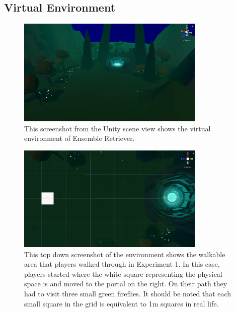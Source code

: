 \subsection{Virtual Environment}
\begin{figure}[tbph]
    \centering
    \includegraphics[width=0.8\textwidth]{figures/screenshots/EnvironmentKindaLowRes.png}
    \caption[Screenshot of the Environment in Ensemble Retriever]{This screenshot from the Unity scene view shows the virtual environment of Ensemble Retriever.}
    \label{fig:ensembleRetrieverEnvironment}
\end{figure}

\begin{figure}[tbph]
    \centering
    \includegraphics[width=0.8\textwidth]{figures/screenshots/TopDownExperiment1Spawn.png}
    \caption[Top Down Screenshot of Virtual Space That Players Walked Through]{This top down screenshot of the environment shows the walkable area that players walked through in Experiment 1. In this case, players started where the white square representing the physical space is and moved to the portal on the right. On their path they had to visit three small green fireflies. It should be noted that each small square in the grid is equivalent to 1m squares in real life.}
    \label{fig:topDownViewOfEnvironment}
\end{figure}


